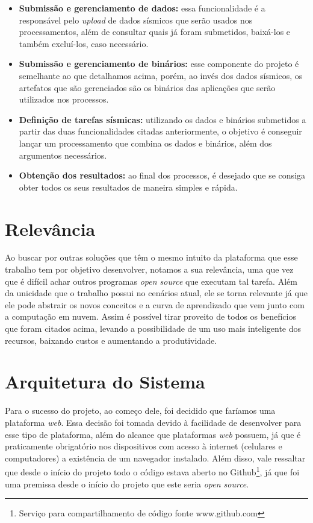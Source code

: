 \documentclass[11pt,twoside]{article}
\begin{document}
\begin{itemize}
  \item \textbf{Submissão e gerenciamento de dados:} essa funcionalidade é a responsável pelo \emph{upload} de dados sísmicos que serão usados nos processamentos, além de consultar quais já foram submetidos, baixá-los e também
  excluí-los, caso necessário. 
  \item \textbf{Submissão e gerenciamento de binários:} esse componente do projeto é semelhante ao que detalhamos acima, porém, ao invés dos dados sísmicos, os artefatos que são gerenciados são os 
  binários das aplicações que serão utilizados nos processos.
  \item \textbf{Definição de tarefas sísmicas:} utilizando os dados e binários submetidos a partir das duas funcionalidades citadas anteriormente, o objetivo é conseguir lançar um processamento que combina os dados e 
  binários, além dos argumentos necessários.
  \item \textbf{Obtenção dos resultados:} ao final dos processos, é desejado que se consiga obter todos os seus resultados de maneira simples e rápida.
\end{itemize}

\section{Relevância}
Ao buscar por outras soluções que têm o mesmo intuito da plataforma que esse trabalho tem por objetivo desenvolver, notamos a sua relevância, uma que vez que é difícil achar outros programas \emph{open source} que executam tal tarefa.
Além da unicidade que o trabalho possui no cenários atual, ele se torna relevante já que ele pode abstrair os novos conceitos e a curva de aprendizado que vem junto com a computação em nuvem. Assim é possível
tirar proveito de todos os benefícios que foram citados acima, levando a possibilidade de um uso mais inteligente dos recursos, baixando custos e aumentando a produtividade.

\section{Arquitetura do Sistema}
Para o sucesso do projeto, ao começo dele, foi decidido que faríamos uma plataforma \emph{web}. Essa decisão  foi tomada devido à facilidade de desenvolver para esse tipo de plataforma, além do alcance que 
plataformas \emph{web} possuem, já que é praticamente obrigatório nos dispositivos com acesso à internet (celulares e computadores) a existência de um
navegador instalado. Além disso, vale ressaltar que desde o início do projeto todo o código estava aberto no Github\footnote{Serviço para compartilhamento de código fonte www.github.com}, 
já que foi uma premissa desde o início do projeto que este seria \emph{open source}.
\end{document}

